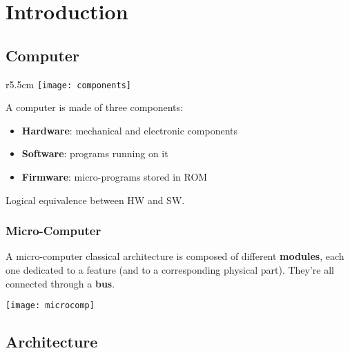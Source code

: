 \section{Introduction}
\subsection{Computer}
\begin{wrapfigure}{r}{5.5cm}
	\texttt{[image: components]}
\end{wrapfigure}
A computer is made of three components:
\begin{itemize}
	\item \textbf{Hardware}: mechanical and electronic components
	\item \textbf{Software}: programs running on it
	\item \textbf{Firmware}: micro-programs stored in ROM
\end{itemize}

\begin{note}
	Logical equivalence between HW and SW.
\end{note}

\subsubsection{Micro-Computer}
A micro-computer classical architecture is composed of different \textbf{modules}, each one dedicated to a feature (and to a corresponding physical part). They're all connected through a \textbf{bus}.
\begin{center}
	\texttt{[image: microcomp]}
\end{center}

\subsection{Architecture}
